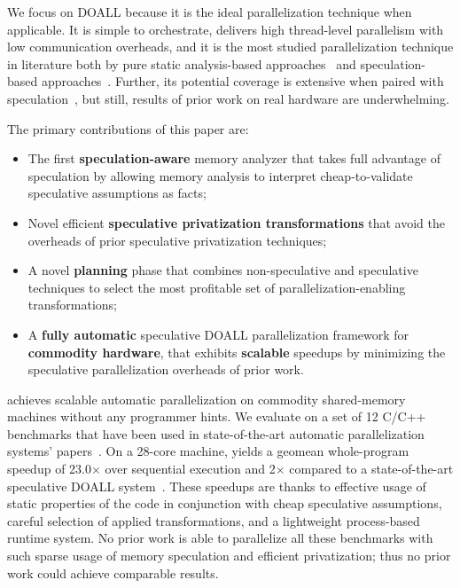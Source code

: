 We focus on DOALL because it is the ideal parallelization technique
when applicable. It is simple to orchestrate, delivers high
thread-level parallelism with low communication overheads, and it is
the most studied parallelization technique in literature both by pure
static analysis-based approaches~\cite{..,.,..} and speculation-based
approaches~\cite{..,..,..,..}.  Further, its potential coverage is
extensive when paired with speculation~\cite{zhong:08:hpca}, but still,
results of prior work on real hardware are underwhelming.

The primary contributions of this paper are:
\begin{itemize}

\item The first \textbf{speculation-aware} memory analyzer that takes
full advantage of speculation by allowing memory analysis to interpret
cheap-to-validate speculative assumptions as facts;

\item Novel efficient \textbf{speculative privatization transformations}
that avoid the overheads of prior speculative privatization
techniques;

\item A novel \textbf{planning} phase that combines non-speculative
and speculative techniques to select the most profitable set of
parallelization-enabling transformations;

\item A \textbf{fully automatic} speculative DOALL parallelization
framework for \textbf{commodity hardware}, that exhibits
\textbf{scalable} speedups by minimizing the speculative
parallelization overheads of prior work.

\end{itemize}

\name achieves scalable automatic parallelization on commodity
shared-memory machines without any programmer hints.  We evaluate
\name on a set of 12 C/C++ benchmarks that have been used in
state-of-the-art automatic parallelization systems'
papers~\cite{johnson:12:pldi,kim:12:cgo,simone:12:cgo}. On a
28-core machine, \name yields a geomean whole-program speedup of
23.0$\times$ over sequential execution and 2$\times$ compared to a
state-of-the-art speculative DOALL system~\cite{johnson:12:pldi}.
These speedups are thanks to effective usage of static properties of
the code in conjunction with cheap speculative assumptions,
%
careful selection of applied transformations, and a lightweight
process-based runtime system.  No prior work is able to parallelize
all these benchmarks with such sparse usage of memory speculation and
efficient privatization; thus no prior work could achieve comparable results.
